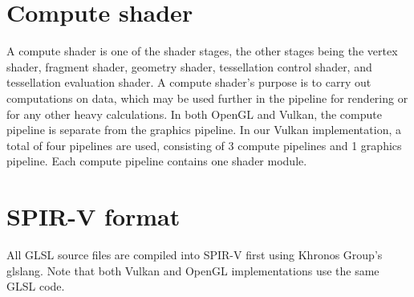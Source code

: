\documentclass[a4paper, 12pt, oneside]{book}
\begin{document}
\section{Compute shader}

\begin{doublespace}
    A compute shader is one of the shader stages, the other stages being the vertex shader, fragment shader, geometry shader, tessellation control shader, and  tessellation evaluation shader. A compute shader's purpose is to carry out computations on data, which may be used further in the pipeline for rendering or for any other heavy calculations. In both OpenGL and Vulkan, the compute pipeline is separate from the graphics pipeline. In our Vulkan implementation, a total of four pipelines are used, consisting of 3 compute pipelines and 1 graphics pipeline. Each compute pipeline contains one shader module.
\end{doublespace}

\section{SPIR-V format}
\begin{doublespace}
    All GLSL source files are compiled into SPIR-V first using Khronos Group's glslang. Note that both Vulkan and OpenGL implementations use the same GLSL code. 
\end{doublespace}
\end{document}
